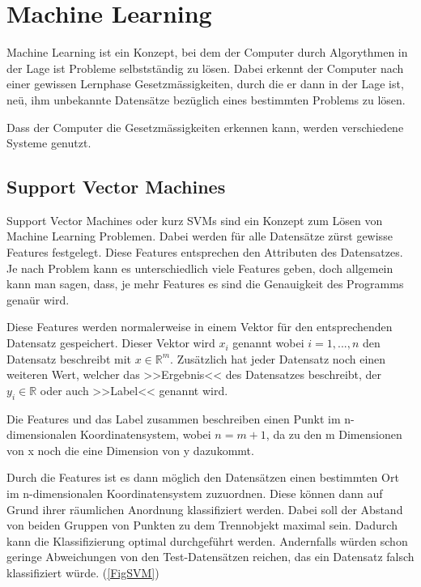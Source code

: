 \newcommand{\media}{../../media/}
\newcommand{\norm}[1]{\left\lVert#1\right\rVert}

\section{Machine Learning}
\author{Farhadiba Mohammed, Dennis Kempf, David Steinmann}
Machine Learning ist ein Konzept, bei dem der Computer durch Algorythmen in der Lage ist Probleme selbstständig zu lösen. Dabei erkennt der Computer nach einer gewissen Lernphase Gesetzmässigkeiten, durch die er dann in der Lage ist, neü, ihm unbekannte Datensätze bezüglich eines bestimmten Problems zu lösen.

Dass der Computer die Gesetzmässigkeiten erkennen kann, werden verschiedene Systeme genutzt.

\subsection{Support Vector Machines}
\author{David Steinmann}
Support Vector Machines oder kurz SVMs sind ein Konzept zum Lösen von Machine Learning Problemen.
Dabei werden für alle Datensätze zürst gewisse Features festgelegt. Diese Features entsprechen den Attributen des Datensatzes. Je nach Problem kann es unterschiedlich viele Features geben, doch allgemein kann man sagen, dass, je mehr Features es sind die Genauigkeit des Programms genaür wird.

Diese Features werden normalerweise in einem Vektor für den entsprechenden Datensatz gespeichert.
Dieser Vektor wird $x_{i}$ genannt wobei $i = 1, ..., n$ den Datensatz beschreibt mit  $x \in  \mathbb{R}^m$.
Zusätzlich hat jeder Datensatz noch einen weiteren Wert, welcher das >>Ergebnis<< des Datensatzes beschreibt, der $y_{i} \in \mathbb{R}$ oder auch >>Label<< genannt wird.

Die Features und das Label zusammen beschreiben einen Punkt im n-dimensionalen Koordinatensystem, wobei $n = m + 1$, da zu den m Dimensionen von x noch die eine Dimension von y dazukommt.

Durch die Features ist es dann möglich den Datensätzen einen bestimmten Ort im n-dimensionalen Koordinatensystem zuzuordnen. Diese können dann auf Grund ihrer räumlichen Anordnung klassifiziert werden. Dabei soll der Abstand von beiden Gruppen von Punkten zu dem Trennobjekt maximal sein. Dadurch kann die Klassifizierung optimal durchgeführt werden. Andernfalls würden schon geringe Abweichungen von den Test-Datensätzen reichen, das ein Datensatz falsch klassifiziert würde. (\ref{FigSVM})

